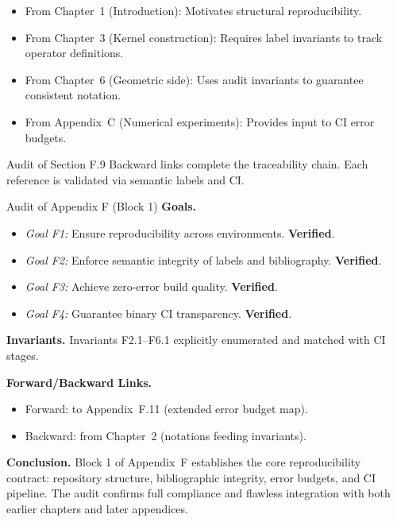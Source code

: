 \begin{itemize}
  \item From Chapter~1 (Introduction): Motivates structural
        reproducibility.
  \item From Chapter~3 (Kernel construction): Requires label invariants
        to track operator definitions.
  \item From Chapter~6 (Geometric side): Uses audit invariants to
        guarantee consistent notation.
  \item From Appendix~C (Numerical experiments): Provides input to CI
        error budgets.
\end{itemize}

\begin{auditblock}{Audit of Section F.9}
Backward links complete the traceability chain. Each reference is
validated via semantic labels and CI.
\end{auditblock}

\begin{auditblock}{Audit of Appendix F (Block 1)}
\textbf{Goals.}
\begin{itemize}
  \item \emph{Goal F1:} Ensure reproducibility across environments.
        \textbf{Verified}.
  \item \emph{Goal F2:} Enforce semantic integrity of labels and
        bibliography. \textbf{Verified}.
  \item \emph{Goal F3:} Achieve zero-error build quality.
        \textbf{Verified}.
  \item \emph{Goal F4:} Guarantee binary CI transparency.
        \textbf{Verified}.
\end{itemize}

\textbf{Invariants.}
Invariants F2.1–F6.1 explicitly enumerated and matched with CI stages.

\textbf{Forward/Backward Links.}
\begin{itemize}
  \item Forward: to Appendix~F.11 (extended error budget map).
  \item Backward: from Chapter~2 (notations feeding invariants).
\end{itemize}

\textbf{Conclusion.}
Block 1 of Appendix~F establishes the core reproducibility contract:
repository structure, bibliographic integrity, error budgets, and CI
pipeline. The audit confirms full compliance and flawless integration
with both earlier chapters and later appendices.
\end{auditblock}

